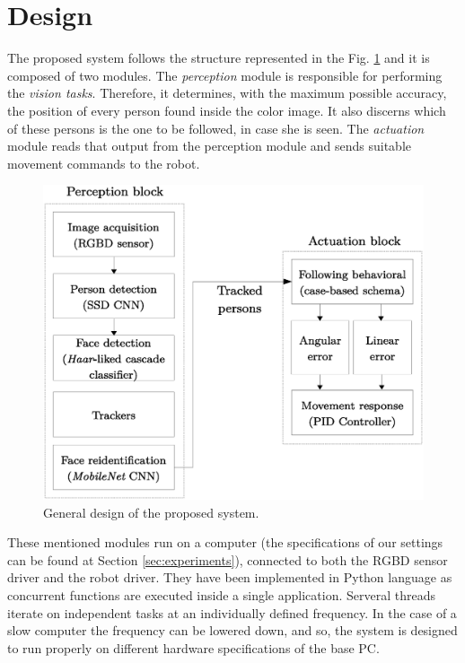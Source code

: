 \section{Design}

The proposed system follows the structure represented in the Fig. \ref{fig:infra_scheme} and it is composed of two modules. The \emph{perception} module is responsible for performing the \emph{vision tasks}. Therefore, it determines, with the maximum possible accuracy, the position of every person found inside the color image. It also discerns which of these persons is the one to be followed, in case she is seen. The \emph{actuation} module reads that output from the perception module and sends suitable movement commands to the robot.

\begin{figure}[h]
	\centering
	\includegraphics[width=12cm]{images/system_schema}
	\caption{General design of the proposed system.}
	\label{fig:infra_scheme}
\end{figure}

These mentioned modules run on a computer (the specifications of our settings can be found at Section \ref{sec:experiments}), connected to both the RGBD sensor driver and the robot driver. They have been implemented in Python language as concurrent functions are executed inside a single application. Serveral threads iterate on independent tasks at an individually defined frequency. In the case of a slow computer the frequency can be lowered down, and so, the system is designed to run properly on different hardware specifications of the base PC.